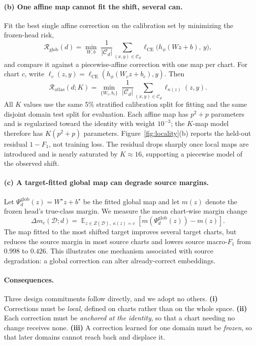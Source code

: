 \documentclass[letterpaper]{article} %
\begin{document}
\paragraph{(b) One affine map cannot fit the shift, several can.}
Fit the best single affine correction on the calibration set by minimizing the
frozen-head risk,
\begin{equation}
\mathcal{R}_{\mathrm{glob}}(d)
=
\min_{W,b}\;
\frac{1}{|\mathcal{C}_d|}\!\!\sum_{(x,y)\in\mathcal{C}_d}\!\!
\ell_{\mathrm{CE}}\big(h_\phi(Wz+b),\,y\big),
\end{equation}
and compare it against a piecewise-affine correction with one map per chart.
For chart $c$, write
$\ell_c(z,y)=\ell_{\mathrm{CE}}(h_\phi(W_cz+b_c),y)$. Then
\begin{equation}
\mathcal{R}_{\mathrm{atlas}}(d;K)
=
\min_{\{W_c,b_c\}}\;
\frac{1}{|\mathcal{C}_d|}\!\!\sum_{(x,y)\in\mathcal{C}_d}\!\!
\ell_{\kappa(z)}(z,y).
\end{equation}
All $K$ values use the same 5\% stratified calibration split for fitting and the
same disjoint domain test split for evaluation. Each affine map has $p^2+p$
parameters and is regularized toward the identity with weight $10^{-3}$; the
$K$-map model therefore has $K(p^2+p)$ parameters. Figure~\ref{fig:locality}(b)
reports the held-out residual $1-F_1$, not training loss. The residual drops
sharply once local maps are introduced and is nearly saturated by
$K\!\approx\!16$, supporting a piecewise model of the observed shift.

\paragraph{(c) A target-fitted global map can degrade source margins.}
Let $\Psi_d^{\mathrm{glob}}(z)=W^{\star}z+b^{\star}$ be the fitted global map and
let $m(z)$ denote the frozen head's true-class margin. We measure the mean
chart-wise margin change
\begin{equation}
\Delta m_c(\mathcal D;d)
=
\mathop{\mathbb{E}}_{z\in Z(\mathcal D),\;\kappa(z)=c}
\left[m\!\left(\Psi_d^{\mathrm{glob}}(z)\right)-m(z)\right].
\end{equation}
The map fitted to the most shifted target improves several target charts, but
reduces the source margin in most source charts and lowers source macro-$F_1$
from $0.998$ to $0.426$. This illustrates one mechanism associated with source
degradation: a global correction can alter already-correct embeddings.

\paragraph{Consequences.}
Three design commitments follow directly, and we adopt no others.
\textbf{(i)} Corrections must be \emph{local}, defined on charts rather than on
the whole space. \textbf{(ii)} Each correction must be \emph{anchored at the
identity}, so that a chart needing no change receives none. \textbf{(iii)} A
correction learned for one domain must be \emph{frozen}, so that later domains
cannot reach back and displace it.
\end{document}
